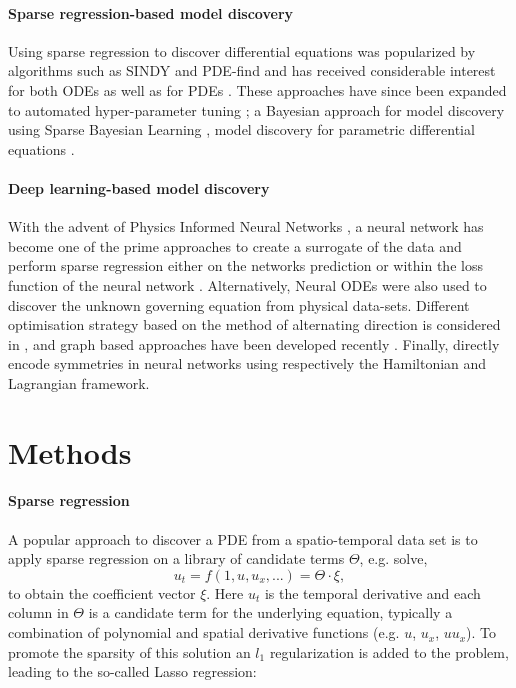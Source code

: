 \documentclass{article} %
\begin{document}
\paragraph{Sparse regression-based model discovery} Using sparse regression to discover differential equations was popularized by algorithms such as SINDY \cite{brunton_discovering_2016} and PDE-find \cite{rudy_data-driven_2017} and has received considerable interest for both ODEs \cite{mangan2017,messenger2020} as well as for PDEs \cite{rudy2017,long2018, vaddireddy2020}. These approaches have since been expanded to automated hyper-parameter tuning \cite{champion_data-driven_2019, maddu_stability_2019}; a Bayesian approach for model discovery using Sparse Bayesian Learning \cite{yuan_machine_2019}, model discovery for parametric differential equations \cite{rudy_deep_2019}.

\paragraph{Deep learning-based model discovery} With the advent of Physics Informed Neural Networks \cite{raissi_physics_2017, raissi_physics_2017-1}, a neural network has become one of the prime approaches to create a surrogate of the data and perform sparse regression either on the networks prediction \cite{schaeffer_learning_2017, berg_data-driven_2019} or within the loss function of the neural network \cite{both2019,both2020}. Alternatively, Neural ODEs were also used to discover the unknown governing equation \cite{rackauckas_universal_2020} from physical data-sets. Different optimisation strategy based on the method of alternating direction is considered in \cite{chen_deep_2020}, and graph based approaches have been developed recently \cite{seo_differentiable_2019, sanchez-gonzalez_graph_2018}. Finally, \cite{cranmer_lagrangian_2020, greydanus_hamiltonian_2019} directly encode symmetries in neural networks using respectively the Hamiltonian and Lagrangian framework.


\section{Methods}

\paragraph{Sparse regression}

A popular approach to discover a PDE from a spatio-temporal data set is to apply sparse regression on a library of candidate terms $\Theta$, e.g. solve, 
\begin{equation}
    u_t = f(1,u, u_x, ...) =   \Theta \cdot \xi,
\end{equation} 
to obtain the coefficient vector $\xi$. Here $u_t$ is the temporal derivative and each column in $\Theta$ is a candidate term for the underlying equation, typically a combination of polynomial and spatial derivative functions (e.g. $u$, $u_x$, $uu_x$). To promote the sparsity of this solution an $l_1$ regularization is added to the problem, leading to the so-called Lasso regression:
\end{document}
